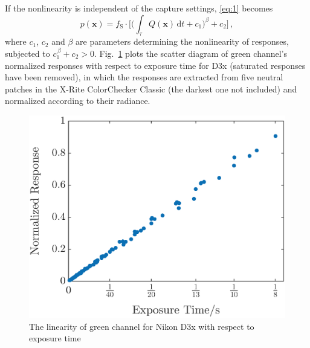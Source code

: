 \documentclass[9pt,twocolumn,twoside]{osajnl}
\newcommand{\D}{\mathrm{d}}
\begin{document}
If the nonlinearity is independent of the capture settings, \eqref{eq:1} becomes 
\begin{equation}
p(\mathbf{x}) = f_\text{S}\cdot\bigg[\Big(\int_\tau Q(\mathbf{x})\,\D{t}+c_1\Big)^\beta+c_2\bigg]\,,
\label{eq:3}
\end{equation}
where $c_1$, $c_2$ and $\beta$ are parameters determining the nonlinearity of responses, subjected to $c_1^{\,\beta}+c_2>0$. Fig.~\ref{fig:3} plots the scatter diagram of green channel's normalized responses with respect to exposure time for D3x (saturated responses have been removed), in which the responses are extracted from five neutral patches in the X-Rite ColorChecker Classic (the darkest one not included) and normalized according to their radiance.

\begin{figure}[tbp]
	\centering
	\includegraphics[width=.73\linewidth]{Fig3}
	\caption{The linearity of green channel for Nikon D3x with respect to exposure time}
	\label{fig:3}
\end{figure}
\end{document}
